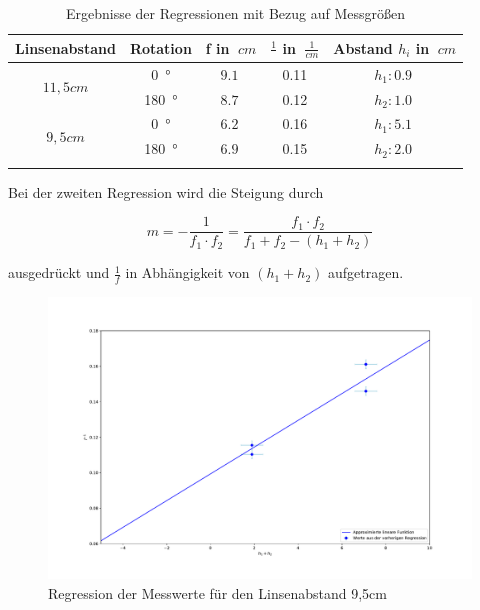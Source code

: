 \begin{table}[h!]
    \begin{center}
        \caption{Ergebnisse der Regressionen mit Bezug auf Messgrößen}
        \begin{tabular}{ccccc}
            \hline
            Linsenabstand           & Rotation          & f in $\SI{}{cm}$  & $\frac{1}{}$ in $\SI{}{\frac{1}{cm}}$ & Abstand $h_i$ in $\SI{}{cm}$\\
            \hline
            
            \multirow{2}{*}{$11,5cm$}   & \SI{0}{\degree}   & $\SI{9,1}{}$      & {\SI{0,11}{}}  & $h_1: \SI{0,9}{}$ \\
                                        & \SI{180}{\degree} & $\SI{8,7}{}$      & {\SI{0,12}{}}  & $h_2: \SI{1,0}{}$ \\
            \hline
            \multirow{2}{*}{$9,5cm$}    & \SI{0}{\degree}   & $\SI{6,2}{}$      & {\SI{0,16}{}}  & $h_1: \SI{5,1}{}$ \\
                                        & \SI{180}{\degree} & $\SI{6,9}{}$      & {\SI{0,15}{}} & $h_2: \SI{2,0}{}$ \\
            \hline
            \label{tab:abbe-Regression-Werte}
        \end{tabular}
    \end{center}
\end{table}

\clearpage

Bei der zweiten Regression wird die Steigung durch

\begin{equation}
    m = - \frac{1}{f_1 \cdot f_2} = \frac{f_1 \cdot f_2}{f_1 + f_2 - (h_1 + h_2)}
\end{equation}

ausgedrückt und $\frac{1}{f}$ in Abhängigkeit von $(h_1 + h_2)$ aufgetragen.

\begin{figure}[h!]{}
    \begin{center}
        \includegraphics{./fig/Abbe_h1h2_Plot.pdf}
        \caption{Regression der Messwerte für den Linsenabstand 9,5cm}
        \label{fig:Abbe-Regress-h1h2}
    \end{center}
\end{figure}

